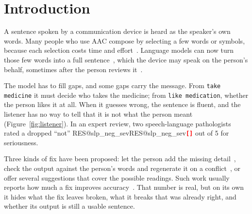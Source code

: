 \documentclass[letterpaper]{article} %
\makeatletter
\newcommand{\RES}[1]{\ifcsname RES@#1\endcsname\csname RES@#1\endcsname\else\RESmissing{#1}\fi}
\newcommand{\RESmissing}[1]{\textcolor{red}{\textbf{\texttt{[\detokenize{#1}]}}}}
\newcommand{\kw}[1]{\texttt{#1}}
\newcommand{\say}[1]{``#1''}
\makeatother
\begin{document}
\section{Introduction}
A sentence spoken by a communication device is heard as the speaker's own words.
Many people who use AAC compose by selecting a few words or symbols, because each selection costs time and effort~\cite{valencia2023less,cai2024speakfaster}.
Language models can now turn those few words into a full sentence~\cite{shen2022kwickchat,cai2024speakfaster}, which the device may speak on the person's behalf, sometimes after the person reviews it~\cite{hancock2020aimc,valencia2020agency}.

The model has to fill gaps, and some gaps carry the message.
From \kw{take medicine} it must decide who takes the medicine; from \kw{like medication}, whether the person likes it at all.
When it guesses wrong, the sentence is fluent, and the listener has no way to tell that it is not what the person meant (Figure~\ref{fig:listener}).
In an expert review, two speech-language pathologists rated a dropped \say{not} \RES{slp_neg_sev} out of 5 for seriousness.

Three kinds of fix have been proposed: let the person add the missing detail~\cite{valencia2024compa,mao2025designprobes,xiang2025socializechat}, check the output against the person's words and regenerate it on a conflict~\cite{madaan2023selfrefine,gou2024critic}, or offer several suggestions that cover the possible readings.
Such work usually reports how much a fix improves accuracy~\cite{cai2022abbrev,shen2022kwickchat,cai2024speakfaster}.
That number is real, but on its own it hides what the fix leaves broken, what it breaks that was already right, and whether its output is still a usable sentence.
\end{document}
